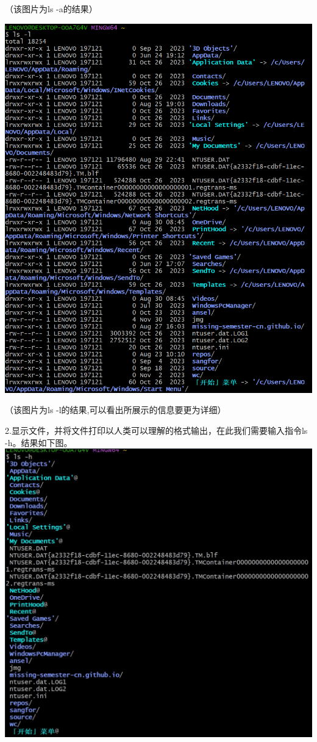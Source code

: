 \documentclass[UTF8,a4paper]{ctexart}
\begin{document}
\begin{sloppypar}
	（该图片为ls -a的结果）

	\includegraphics[width = 16cm]{2}
	
	（该图片为ls -l的结果,可以看出所展示的信息要更为详细）

	2.显示文件，并将文件打印以人类可以理解的格式输出，在此我们需要输入指令ls -h。结果如下图。
	\includegraphics[width = 16cm]{3}


\end{sloppypar}
\end{document}
